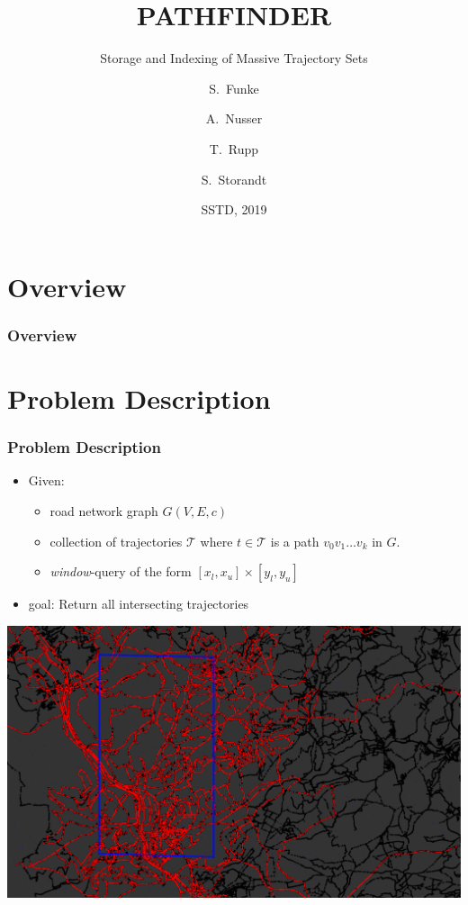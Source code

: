 \documentclass{beamer}
\title[Pathfinder] %
{PATHFINDER}
\subtitle{Storage and Indexing of Massive Trajectory Sets}
\author[Funke, Nusser, Rupp, Storandt] %
{S.~Funke\inst{1} \and A.~Nusser\inst{2} \and T.~Rupp\inst{3} \and S.~Storandt\inst{4}}
\institute[Universities] %
{
	\inst{1}%
	University of Stuttgart
	\and
	\inst{2}%
	Max Planck Institute for Informatics
	\and
	\inst{3}%
	University of Stuttgart
	\and
	\inst{4}%
	University of Konstanz
}
\date[SSTD 2019] %
{SSTD, 2019}
\begin{document}
\frame{\titlepage}

\section{Overview}
\begin{frame}
	\frametitle{Overview}
	\tableofcontents[
		currentsection=show,
		currentsubsection=shaded,
		subsectionstyle=hide
	]
\end{frame}

\section{Problem Description}
\begin{frame}
	\frametitle{Problem Description}
	\begin{itemize}
		\item Given: \pause
		      \begin{itemize}
			      \item road network graph $G(V,E,c)$ \pause
			      \item collection of trajectories $\mathcal{T}$ where $t\in \mathcal{T}$ is a path $v_0 v_1 \dots v_k$ in $G$. \pause
			      \item \emph{window}-query of the form $[x_l, x_u]\times[y_l, y_u]$ \pause
		      \end{itemize}
		\item goal: Return all intersecting trajectories \pause
	\end{itemize}
	\includegraphics[width=0.75\linewidth]{graphics/saarland_real_data_gimp.pdf}
\end{frame}
\end{document}
